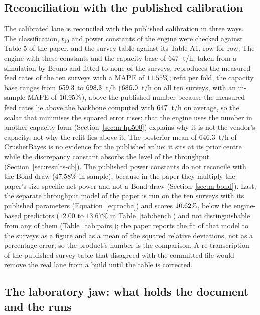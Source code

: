\subsection{Reconciliation with the published calibration}\label{sec:val-published}

The calibrated lane is reconciled with the published calibration in three ways. The classification, $t_{10}$ and power constants of the engine
were checked against Table 5 of the paper, and the survey table against its Table A1, row for row. The engine with these constants and the
capacity base of $647$~t/h, taken from a simulation by Bruno and fitted to none of the surveys, reproduces the measured feed rates of the ten
surveys with a MAPE of $11.55\%$; refit per fold, the capacity base ranges from $659.3$ to $698.3$~t/h ($686.0$~t/h on all
ten surveys, with an in-sample MAPE of $10.95\%$), above the published number because the measured feed rates
lie above the backbone computed with $647$~t/h on average, so the scalar that minimises the squared error rises; that the engine uses the number in
another capacity form (Section~\ref{sec:m-hp500}) explains why it is not the vendor's capacity, not why the refit lies above it. The posterior mean of $646.3$~t/h of CrusherBayes is no evidence for the published value: it
sits at its prior centre while the discrepancy constant absorbs the level of the throughput (Section~\ref{sec:results-cb}). The published power
constants do not reconcile with the Bond draw ($47.58\%$ in sample), because in the paper they multiply the paper's size-specific net power and
not a Bond draw (Section~\ref{sec:m-bond}). Last, the separate throughput model of the paper is run on the ten surveys with its published
parameters (Equation~\eqref{eq:rocha}) and scores $10.62\%$, below the engine-based predictors ($12.00$ to $13.67\%$ in Table~\ref{tab:bench}) and not distinguishable from
any of them (Table~\ref{tab:pairs}); the
paper reports the fit of that model to the surveys as a figure and as a mean of the squared relative deviations, not as a percentage error, so the
product's number is the comparison. A re-transcription of the published survey table that disagreed with the committed file would remove the real
lane from a build until the table is corrected.

\subsection{The laboratory jaw: what holds the document and the runs}\label{sec:val-dem}

